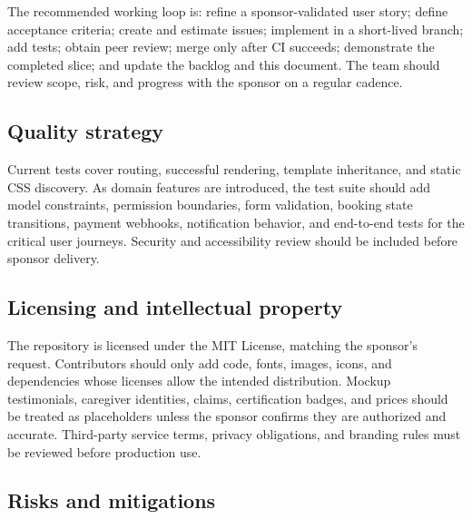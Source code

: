 \documentclass[11pt]{article}
\begin{document}
The recommended working loop is: refine a sponsor-validated user story; define acceptance criteria; create and estimate issues; implement in a short-lived branch; add tests; obtain peer review; merge only after CI succeeds; demonstrate the completed slice; and update the backlog and this document. The team should review scope, risk, and progress with the sponsor on a regular cadence.

\subsection{Quality strategy}

Current tests cover routing, successful rendering, template inheritance, and static CSS discovery. As domain features are introduced, the test suite should add model constraints, permission boundaries, form validation, booking state transitions, payment webhooks, notification behavior, and end-to-end tests for the critical user journeys. Security and accessibility review should be included before sponsor delivery.

\subsection{Licensing and intellectual property}

The repository is licensed under the MIT License, matching the sponsor's request. Contributors should only add code, fonts, images, icons, and dependencies whose licenses allow the intended distribution. Mockup testimonials, caregiver identities, claims, certification badges, and prices should be treated as placeholders unless the sponsor confirms they are authorized and accurate. Third-party service terms, privacy obligations, and branding rules must be reviewed before production use.

\subsection{Risks and mitigations}
\end{document}
